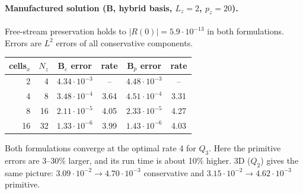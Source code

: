 \documentclass[11pt,a4paper]{article}
\begin{document}
\paragraph{Manufactured solution (B, hybrid basis, $L_z=2$, $p_z=20$).}
Free-stream preservation holds to $|R(0)|=5.9\cdot10^{-13}$ in both formulations.
Errors are $L^2$ errors of all conservative components.
\begin{center}
\begin{tabular}{@{}rrcccc@{}}
\toprule
cells$_x$ & $N_z$ & B$_c$ error & rate & B$_p$ error & rate\\
\midrule
2 & 4 & $4.34\cdot10^{-3}$ & -- & $4.48\cdot10^{-3}$ & --\\
4 & 8 & $3.48\cdot10^{-4}$ & 3.64 & $4.51\cdot10^{-4}$ & 3.31\\
8 & 16 & $2.11\cdot10^{-5}$ & 4.05 & $2.33\cdot10^{-5}$ & 4.27\\
16 & 32 & $1.33\cdot10^{-6}$ & 3.99 & $1.43\cdot10^{-6}$ & 4.03\\
\bottomrule
\end{tabular}
\end{center}
Both formulations converge at the optimal rate 4 for $Q_3$. Here the primitive
errors are 3--30\% larger, and its run time is about 10\% higher. 3D ($Q_2$) gives the
same picture: $3.09\cdot10^{-2}\to4.70\cdot10^{-3}$ conservative and
$3.15\cdot10^{-2}\to4.62\cdot10^{-3}$ primitive.
\end{document}
